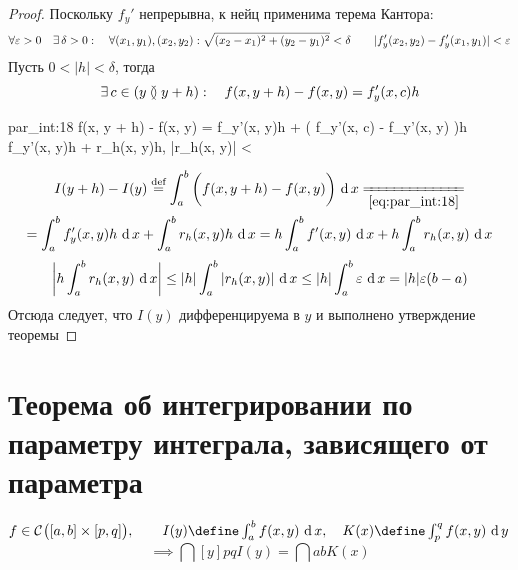 \begin{proof}
	Поскольку $ f_y' $ непрерывна, к нейц применима терема Кантора:
	$$ \forall \varepsilon > 0 \quad \exists\, \delta > 0 : \quad \forall (x_1, y_1), (x_2, y_2) : \sqrt{(x_2 - x_1)^2 + (y_2 - y_1)^2} < \delta \qquad |f_y'(x_2, y_2) - f_y'(x_1, y_1)| < \varepsilon $$
	Пусть $ 0 < |h| < \delta $, тогда
	$$ \exists\, c \in (y \between y + h) : \quad f(x, y + h) - f(x, y) = f_y'(x, c)h $$
	\begin{equ}{par_int:18}
		f(x, y + h) - f(x, y) = f_y'(x, y)h + \bigg( f_y'(x, c) - f_y'(x, y) \bigg)h  f_y'(x, y)h + r_h(x, y)h, \qquad |r_h(x, y)| < \veps
	\end{equ}
	\begin{multline*}
		I(y + h) - I(y) \bydef \dint{a}b{\bigg( f(x, y + h) - f(x, y) \bigg)} \undereq{\eref{par_int:18}} \\
		= \dint{a}b{f_y'(x, y)h} + \dint{a}b{r_h(x, y)h} = h\dint{a}b{f'(x, y)} + h\dint{a}b{r_h(x, y)}
	\end{multline*}
	$$ \bigg| h\int_{a}^{b} {r_h(x, y)} \, \operatorname{d} {x}\bigg| \le |h| \int_{a}^{b} {|r_h(x, y)|} \, \operatorname{d} {x} \le |h| \int_{a}^{b} {\varepsilon} \, \operatorname{d} {x} = |h|\varepsilon(b - a) $$
	Отсюда следует, что $ I(y) $ дифференцируема в $ y $ и выполнено утверждение теоремы
\end{proof}

\section{Теорема об интегрировании по параметру интеграла, зависящего от параметра}

\begin{theorem}
	$ f \in \Cont{[a, b] \times [p, q]}, \qquad I(y) \define \dint{a}b{f(x, y)}, \quad K(x) \define \dint[y]{p}q{f(x, y)} $
	$$ \implies \dint[y]pq{I(y)} = \dint{a}b{K(x)} $$
\end{theorem}

